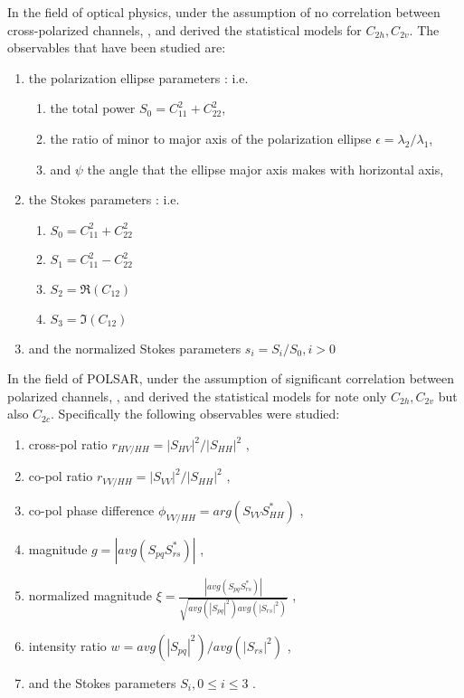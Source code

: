 \documentclass[journal]{IEEEtran}
\begin{document}
In the field of optical physics,
  under the assumption of no correlation between cross-polarized channels,
  \cite{Barakat_1985_IJOptics}, \cite{Eliyahu_1993_PhysRevE_2881} and \cite{Brosseau_1995_AppliedOptics_4788} derived the statistical models for $C_{2h},C_{2v}$.
The observables that have been studied are:
\begin{enumerate}
\item the polarization ellipse parameters \cite{Barakat_1985_IJOptics}: i.e.
  \begin{enumerate}
  \item the total power $S_0=C_{11}^2 + C_{22}^2$,
  \item the ratio of minor to major axis of the polarization ellipse  $\epsilon=\lambda_2/\lambda_1$,
  \item and $\psi$ the angle that the ellipse major axis makes with horizontal axis,
  \end{enumerate}
\item the Stokes parameters \cite{Eliyahu_1993_PhysRevE_2881}: i.e.
  \begin{enumerate}
  \item $S_0 = C_{11}^2 + C_{22}^2$
  \item $S_1 = C_{11}^2 - C_{22}^2$
  \item $S_2 = \Re (C_{12})$
  \item $S_3 = \Im (C_{12})$
  \end{enumerate}
\item and the normalized Stokes parameters $s_i=S_i/S_0, i>0$ \cite{Brosseau_1995_AppliedOptics_4788}
\end{enumerate}
In the field of POLSAR, under the assumption of significant correlation between polarized channels,
  \cite{Joughin_1994_TGRS_562}, \cite{Lee_1994_TGRS_1017} and \cite{Touzi_1996_TGRS_519} derived the statistical models for note only $C_{2h},C_{2v}$ but also $C_{2c}$.
Specifically the following observables were studied:  
  \begin{enumerate}
  \item cross-pol ratio $r_{HV/HH} = |S_{HV}|^2/|S_{HH}|^2$ \cite{Joughin_1994_TGRS_562},
  \item co-pol ratio $r_{VV/HH} = |S_{VV}|^2/|S_{HH}|^2$ \cite{Joughin_1994_TGRS_562},
  \item co-pol phase difference $\phi_{VV/HH} = arg(S_{VV}S_{HH}^*) $ \cite{Joughin_1994_TGRS_562} \cite{Lee_1994_TGRS_1017},
  \item magnitude $g=|avg(S_{pq}S_{rs}^*)|$ \cite{Lee_1994_TGRS_1017},
  \item normalized magnitude $\xi = \frac{|avg(S_{pq}S_{rs}^*)|}{\sqrt{avg(|S_{pq}|^2) avg(|S_{rs}|^2)}}$ \cite{Lee_1994_TGRS_1017},
  \item intensity ratio $w = avg(|S_{pq}|^2)/avg(|S_{rs}|^2)$ \cite{Lee_1994_TGRS_1017},
  \item and the Stokes parameters $S_i,0 \leq i \leq 3$ \cite{Touzi_1996_TGRS_519}. 
  \end{enumerate}
\end{document}
